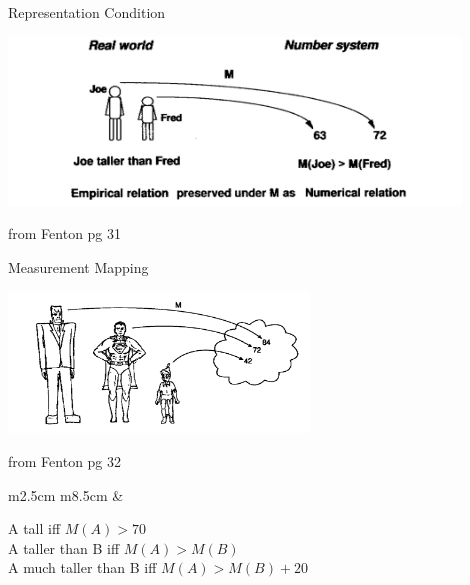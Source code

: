 \documentclass{beamer}
\begin{document}
\begin{frame}{\centerline{Representation Condition}}


\begin{center}
\includegraphics[width=120mm]{A2022.IDSEPC.SperimentazioneDeduzione/img-img10.png}
\newline
\end{center}

\begin{small}
\begin{center}
from Fenton pg 31
\end{center}
\end{small}

\end{frame}

\begin{frame}{\centerline{Measurement Mapping}}


\begin{center}
\includegraphics[width=80mm]{A2022.IDSEPC.SperimentazioneDeduzione/img-img11.png}
\begin{small}
from Fenton pg 32
\end{small}
\end{center}
\begin{table}[H]
\begin{tabulary}{\textwidth}{m{2.5cm} m{8.5cm}}
&\begin{tcolorbox}
A tall iff \(M(A) > 70\)\\
A taller than B iff \(M(A) > M(B)\)\\
A much taller than B iff \(M(A) > M(B) + 20\)
\end{tcolorbox}
\end{tabulary}
\end{table}

\end{frame}
\end{document}
